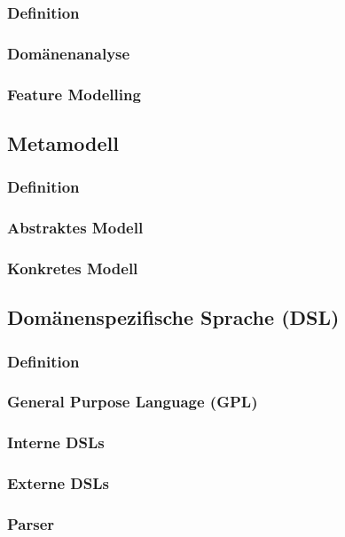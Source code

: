 \documentclass[12pt,oneside,a4paper,parskip]{scrbook}
\begin{document}
\subsubsection{Definition}
\subsubsection{Domänenanalyse}
\subsubsection{Feature Modelling}

\subsection{Metamodell}

\subsubsection{Definition}
\subsubsection{Abstraktes Modell}
\subsubsection{Konkretes Modell}

\subsection{Domänenspezifische Sprache (DSL)}

\subsubsection{Definition}

\subsubsection{General Purpose Language (GPL)}
\subsubsection{Interne DSLs}
\subsubsection{Externe DSLs}
\subsubsection{Parser}
\end{document}
